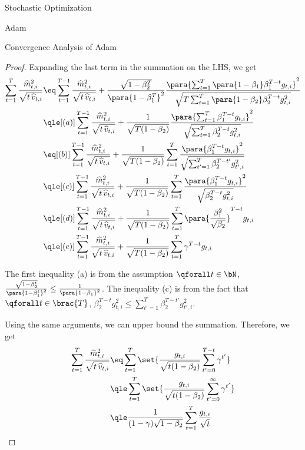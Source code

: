 \documentclass{article}
\begin{document}
\begin{psection}{Stochastic Optimization}
\begin{psubsection}{Adam}
\begin{pssubsection}{Convergence Analysis of Adam}
\begin{lemma}
				\begin{proof}
					Expanding the last term in the summation on the LHS, we get
					\begin{align*}
						\sum_{t = 1}^T \frac{\widehat{m}_{t, i}^2}{\displaystyle \sqrt{t \, \widehat{v}_{t, i}}} &\eq \sum_{t = 1}^{T - 1} \frac{\widehat{m}_{t, i}^2}{\displaystyle \sqrt{t \, \widehat{v}_{t, i}}} + \frac{\sqrt{1 - \beta_2^T}}{\para{1 - \beta_1^T}^2} \frac{\para{\sum_{t = 1}^T \para{1 - \beta_1} \beta_1^{T - t} g_{t, i}}^2}{\sqrt{T \sum_{t = 1}^T \para{1 - \beta_2} \beta_2^{T - t} g_{t, i}^2}} \\
						&\qle[(a)] \sum_{t = 1}^{T - 1} \frac{\widehat{m}_{t, i}^2}{\displaystyle \sqrt{t \, \widehat{v}_{t, i}}} + \frac{1}{\sqrt{T (1 - \beta_2)}} \frac{\para{\sum_{t = 1}^T \beta_1^{T - t} g_{t, i}}^2}{\sqrt{\sum_{t = 1}^T \beta_2^{T - t} g_{t, i}^2}} \\
						&\eq[(b)] \sum_{t = 1}^{T - 1} \frac{\widehat{m}_{t, i}^2}{\displaystyle \sqrt{t \, \widehat{v}_{t, i}}} + \frac{1}{\sqrt{T (1 - \beta_2)}} \sum_{t = 1}^T \frac{\para{\beta_1^{T - t} g_{t, i}}^2}{\sqrt{\sum_{t' = 1}^T \beta_2^{T - t'} g_{t', i}^2}} \\
						&\qle[(c)] \sum_{t = 1}^{T - 1} \frac{\widehat{m}_{t, i}^2}{\displaystyle \sqrt{t \, \widehat{v}_{t, i}}} + \frac{1}{\sqrt{T (1 - \beta_2)}} \sum_{t = 1}^T \frac{\para{\beta_1^{T - t} g_{t, i}}^2}{\sqrt{\beta_2^{T - t} g_{t, i}^2}} \\
						&\qle[(d)] \sum_{t = 1}^{T - 1} \frac{\widehat{m}_{t, i}^2}{\displaystyle \sqrt{t \, \widehat{v}_{t, i}}} + \frac{1}{\sqrt{T (1 - \beta_2)}} \sum_{t = 1}^T \para{\frac{\beta_1^2}{\sqrt{\beta_2}}}^{T - t} g_{t, i} \\
						&\qle[(e)] \sum_{t = 1}^{T - 1} \frac{\widehat{m}_{t, i}^2}{\displaystyle \sqrt{t \, \widehat{v}_{t, i}}} + \frac{1}{\sqrt{T (1 - \beta_2)}} \sum_{t = 1}^T \gamma^{T - t} g_{t, i}
					\end{align*}

					The first inequality (a) is from the assumption $\qforall t \in \bN$, $\frac{\sqrt{1 - \beta_2^t}}{\para{1 - \beta_1^t}^2} \le \frac{1}{\para{1 - \beta_1}^2}$. The inequality (c) is from the fact that $\qforall t \in \brac{T}$, $\beta_2^{T - t} g_{t, i}^2 \le \sum_{t' = 1}^T \beta_2^{T - t'} g_{t', i}^2$.

					Using the same arguments, we can upper bound the summation. Therefore, we get
					\begin{align*}
						\sum_{t = 1}^T \frac{\widehat{m}_{t, i}^2}{\displaystyle \sqrt{t \, \widehat{v}_{t, i}}} &\eq \sum_{t = 1}^T \set{\frac{g_{t, i}}{\sqrt{t (1 - \beta_2)}} \sum_{t' = 0}^{T - t} \gamma^{t'} } \\
						&\qle \sum_{t = 1}^T \set{\frac{g_{t, i}}{\sqrt{t (1 - \beta_2)}} \sum_{t' = 0}^{\infty} \gamma^{t'} } \\
						&\qle \frac{1}{(1 - \gamma) \sqrt{1 - \beta_2}} \sum_{t = 1}^T \frac{g_{t, i}}{\sqrt{t}}
					\end{align*}


\end{proof}
\end{lemma}
\end{pssubsection}
\end{psubsection}
\end{psection}
\end{document}
